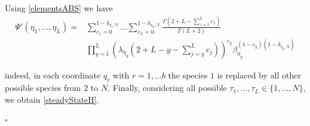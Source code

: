 \documentclass[10pt]{article}
\numberwithin{equation}{section}
\numberwithin{equation}{subsection}
\begin{document}
		Using \eqref{elementsABS} we have 
		\begin{equation}
			\begin{split}
				\Psi{'}(\eta_{1},\ldots,\eta_{L})=&\sum_{c_{1}=0}^{1-\delta_{\eta_{1},N}}\ldots\sum_{c_{L}=0}^{1-\delta_{\eta_{L},N}}\frac{\Gamma(2+L-\sum_{z=1}^{L}c_{z})}{\Gamma(L+2)}
				\\&
				\prod_{y=1}^{L}\left(\lambda_{\eta_{y}}\left(2+L-y-\sum_{j=y}^{L}c_{j}\right)\right)^{c_{y}}\beta_{\eta_{y}}^{(1-c_{y})(1-\delta_{\eta_{y},N})}
			\end{split}
		\end{equation}

indeed, in each coordinate $q_{r}$ with $r=1,\ldots b$ the species $1$ is replaced by all other possible species from $2$ to $N$.  Finally, considering all possible $\tau_{1},\ldots,\tau_{L}\in \{1,\ldots,N\}$, we obtain \eqref{steadyStateH}. 
		\begin{flushright}
			$\square$
		\end{flushright}
\end{document}
